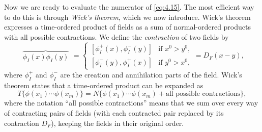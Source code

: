 Now we are ready to evaluate the numerator of \eqref{eq:4.15}.  The most
efficient way to do this is through \emph{Wick's theorem}, which we now
introduce.  Wick's theorem expresses a time-ordered product of fields as a
sum of normal-ordered products with all possible contractions.  We define the
\emph{contraction} of two fields by
\begin{equation}
  \begin{array}{c}
    \overbrace{\phi_I(x)\phi_I(y)}
  \end{array}
  = \begin{cases}
    [\phi_I^+(x), \phi_I^-(y)] & \text{if } x^0 > y^0,\\
    [\phi_I^-(y), \phi_I^+(x)] & \text{if } y^0 > x^0,
  \end{cases}
  = D_F(x-y) ,
  \label{eq:4.29}
\end{equation}
where $\phi_I^+$ and $\phi_I^-$ are the creation and annihilation parts of the
field.  Wick's theorem states that a time-ordered product can be expanded as
\begin{equation}
  T\{\phi(x_1)\cdots\phi(x_m)\} = N\{
    \phi(x_1)\cdots\phi(x_m) + \text{all possible contractions} \},
  \label{eq:4.30}
\end{equation}
where the notation ``all possible contractions'' means that we sum over every
way of contracting pairs of fields (with each contracted pair replaced by its
contraction $D_F$), keeping the fields in their original order.


